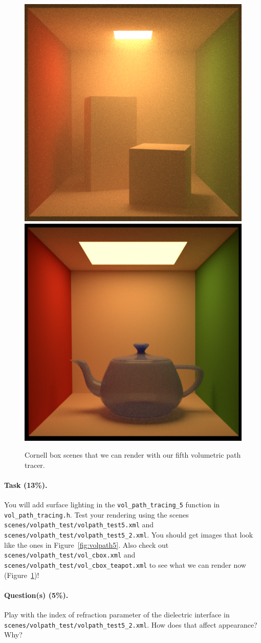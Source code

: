 \begin{figure}
\centering
\includegraphics[width=0.48\linewidth]{imgs/volpath_5_cbox.png}
\includegraphics[width=0.48\linewidth]{imgs/volpath_5_cbox_teapot.png}
\caption{Cornell box scenes that we can render with our fifth volumetric path tracer.}
\label{fig:volpath5_cbox}
\end{figure}

\paragraph{Task (13\%).} You will add surface lighting in the \lstinline{vol_path_tracing_5} function in \lstinline{vol_path_tracing.h}. Test your rendering using the scenes \lstinline{scenes/volpath_test/volpath_test5.xml} and \lstinline{scenes/volpath_test/volpath_test5_2.xml}. You should get images that look like the ones in Figure~\ref{fig:volpath5}. Also check out \lstinline{scenes/volpath_test/vol_cbox.xml} and \lstinline{scenes/volpath_test/vol_cbox_teapot.xml} to see what we can render now (Figure~\ref{fig:volpath5_cbox})!

\paragraph{Question(s) (5\%).} Play with the index of refraction parameter of the dielectric interface in \\
\lstinline{scenes/volpath_test/volpath_test5_2.xml}. How does that affect appearance? Why?

